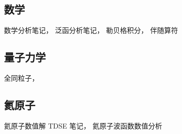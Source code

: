 
\subsection{数学}
数学分析笔记， 泛函分析笔记， 勒贝格积分， 伴随算符

\subsection{量子力学}
全同粒子， 

\subsection{氦原子}
氦原子数值解 TDSE 笔记， 氦原子波函数数值分析
